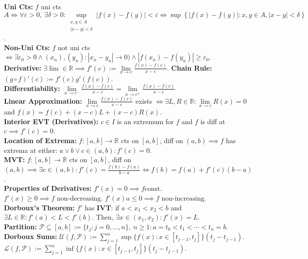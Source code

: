 \documentclass{letter}
\begin{document}
{\textbf{Uni Cts:} $f$ uni cts $A \iff \forall \varepsilon > 0, \
\exists \delta > 0 : \sup\limits_{\substack{x, y \in A \\ |x - y| < \delta}}
|f(x) - f(y)| < \varepsilon \iff \sup\left\{ |f(x) - f(y)| : x, y \in
  A, |x - y| < \delta \right\}$. \\
\textbf{Non-Uni Cts:} $f$ not uni cts $\iff \exists \varepsilon_0 > 0
\land (x_n), (y_n) : |x_n - y_n| \to 0) \land |f(x_n) - f(y_n)| \geq \varepsilon_0$. \\
\textbf{Derivative:} $\exists \lim \in \mathbb{R} \implies f'(c) :=
\lim\limits_{x \to c} \frac{f(x) - f(c)}{x - c}$. \textbf{Chain Rule:}
$(g \circ f)'(c) := f'(c)g'(f(c))$. \\
\textbf{Differentiability:} $\lim\limits_{x \to c^-}
\frac{f(x) - f(c)}{x - c} = \lim\limits_{x \to c^+} \frac{f(x) -
  f(c)}{x - c}$ \\
\textbf{Linear Approximation:} $\lim\limits_{x \to c} \frac{f(x) -
  f(c)}{x - c}$ exists $\iff \exists L, R \in \mathbb{R} :
\lim\limits_{x \to c} R(x) = 0$ and $f(x) = f(c) + (x - c)L + (x -
c)R(x)$. \\
\textbf{Interior EVT (Derivatives):} $c \in I$ is an extremum for $f$ and
$f$ is diff at $c \implies f'(c) = 0$. \\
\textbf{Location of Extrema:} $f : [a, b] \to \mathbb{R}$ cts on $[a,
b]$, diff on $(a, b) \implies f$ has extrema at either: $a \lor b \lor c
\in (a, b) : f'(c) = 0$. \\
\textbf{MVT:} $f : [a, b] \to \mathbb{R}$ cts on $[a,b]$, diff on $(a,
b) \implies \exists c \in (a, b) : f'(c) = \frac{f(b) - f(a)}{b - a}
\iff f(b) = f(a) + f'(c)(b - a)$. \\
\textbf{Properties of Derivatives:} $f'(x) = 0 \implies f \text{
  const}$. $f'(x) \geq 0 \implies f \text{ non-decreasing}$. $f'(x)a
\leq 0 \implies f \text{ non-increasing}$. \\
\textbf{Dorboux's Theorem:} $f'$ has \textbf{IVT}: if $a < x_1 < x_2 <
b$ and $\exists L \in \mathbb{R} : f'(a) < L < f'(b)$. Then, $\exists
x \in (x_1, x_2) : f'(x) = L$. \\
\textbf{Partition:} $\mathcal{P} \subseteq [a, b] := \{t_j : j = 0,
\ldots, n\}, \ n \geq 1 : a = t_0 < t_1 < \cdots < t_n = b$. \\
\textbf{Dorboux Sums:} $\mathcal{U}(f, \mathcal{P}) := \sum\limits_{j
  = 1}^{n} \sup \{f(x) : x \in [t_{j - 1}, t_j]\}(t_j - t_{j - 1})$. $\mathcal{L}(f, \mathcal{P}) := \sum\limits_{j
  = 1}^{n} \inf \{f(x) : x \in [t_{j - 1}, t_j]\}(t_j - t_{j - 1})$. \\
}
\end{document}
